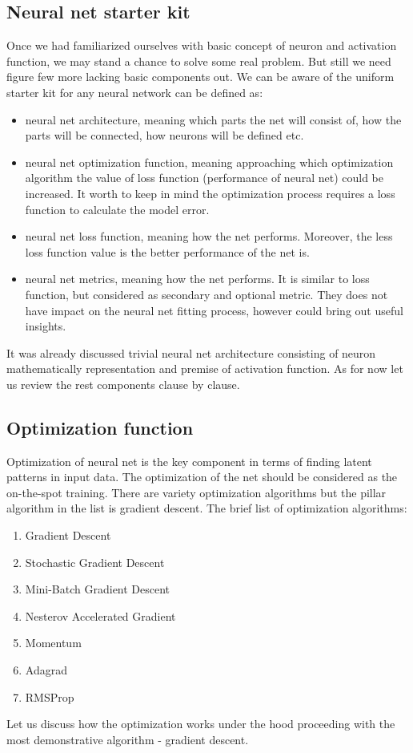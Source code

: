 \subsection{Neural net starter kit}
Once we had familiarized ourselves with basic concept of neuron and activation function, we may stand a chance to solve some real problem. But still we need figure few more lacking basic components out.
We can be aware of the uniform starter kit for any neural network can be defined as:
\begin{itemize}
    \item neural net architecture, meaning which parts the net will consist of, how the parts will be connected, how neurons will be defined etc.
    \item neural net optimization function, meaning approaching which optimization algorithm the value of loss function (performance of neural net) could be increased. It worth to keep in mind the optimization process requires a loss function to calculate the model error.
    \item neural net loss function, meaning how the net performs. Moreover, the less loss function value is the better performance of the net is.
    \item neural net metrics, meaning how the net performs. It is similar to loss function, but considered as secondary and optional metric. They does not have impact on the neural net fitting process, however could bring out useful insights.    
\end{itemize}

It was already discussed trivial neural net architecture consisting of neuron mathematically representation and premise of activation function. As for now let us review the rest components clause by clause.    

\subsection{Optimization function}
Optimization of neural net is the key component in terms of finding latent patterns in input data. The optimization of the net should be considered as the on-the-spot training. There are variety optimization algorithms but the pillar algorithm in the list is gradient descent.
The brief list of optimization algorithms:
\begin{enumerate}
    \item Gradient Descent
    \item Stochastic Gradient Descent
    \item Mini-Batch Gradient Descent
    \item Nesterov Accelerated Gradient
    \item Momentum
    \item Adagrad
    \item RMSProp
\end{enumerate}
Let us discuss how the optimization works under the hood proceeding with the most demonstrative algorithm - gradient descent.

